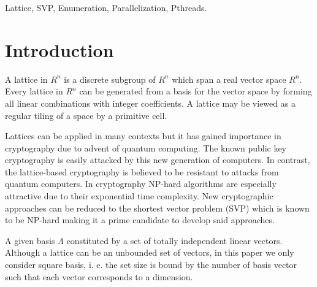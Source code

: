 \documentclass[conference]{IEEEtran}
\begin{document}
\begin{IEEEkeywords}
Lattice, SVP, Enumeration, Parallelization, Pthreads.
\end{IEEEkeywords}


\IEEEpeerreviewmaketitle


\section{Introduction}
    A lattice in $R^n$ is a discrete subgroup of $R^n$ which span a real vector space $R^n$. Every lattice in $R^n$ can be generated from a basis for the vector space by forming all linear combinations with integer coefficients. A lattice may be viewed as a regular tiling of a space by a primitive cell. 

	Lattices can be applied in many contexts but it has gained importance in cryptography due to advent of quantum computing. The known public key cryptography is easily attacked by this new generation of computers. In contrast, the lattice-based cryptography is believed to be resistant to attacks from quantum computers. In cryptography NP-hard algorithms are especially attractive due to their exponential time complexity. New cryptographic approaches can be reduced to the shortest vector problem (SVP) which is known to be NP-hard making it a prime candidate to develop said approaches. 
	
    A given basis $\Lambda$ constituted by a set of totally independent linear vectors. Although a lattice can be an unbounded set  of vectors, in this paper we only consider square basis, i. e. the set size is bound by the number of basis vector such that each vector corresponds to a dimension.
\end{document}
